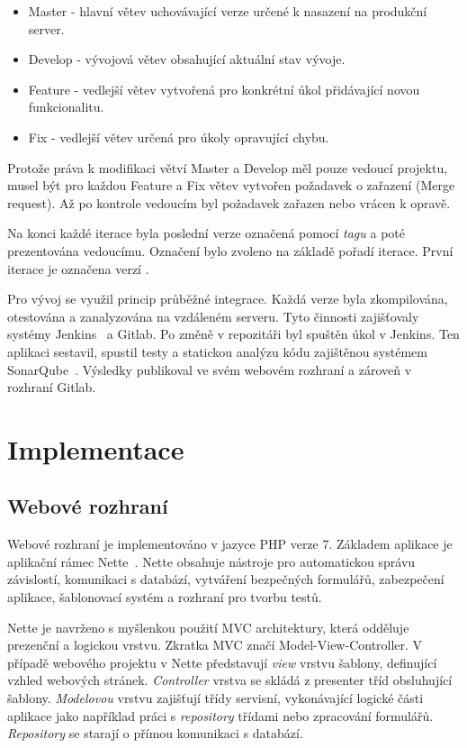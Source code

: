 \documentclass[thesis=B,czech]{FITthesis}[2012/06/26]
\begin{document}
\begin{itemize}
\item Master - hlavní větev uchovávající verze určené k nasazení na produkční server.
\item Develop - vývojová větev obsahující aktuální stav vývoje.
\item Feature - vedlejší větev vytvořená pro konkrétní úkol přidávající novou funkcionalitu.
\item Fix - vedlejší větev určená pro úkoly opravující chybu.
\end{itemize}

Protože práva k modifikaci větví Master a Develop měl pouze vedoucí projektu, musel být pro každou Feature a Fix větev
vytvořen požadavek o zařazení (Merge request). Až po kontrole vedoucím byl požadavek zařazen nebo vrácen k opravě.
\par
Na konci každé iterace byla poslední verze označená pomocí \textit{tagu} a poté prezentována vedoucímu.
Označení bylo zvoleno na základě pořadí iterace. První iterace je označena verzí .
\par
Pro vývoj se využil princip průběžné integrace. Každá verze byla zkompilována, otestována a zanalyzována na vzdáleném serveru.
Tyto činnosti zajišťovaly systémy Jenkins~\cite{jenkins} a Gitlab. Po změně v repozitáři byl spuštěn úkol v Jenkins. Ten aplikaci sestavil, spustil testy a statickou analýzu kódu 
zajištěnou systémem SonarQube~\cite{sonar}. Výsledky publikoval ve svém webovém rozhraní a zároveň v rozhraní Gitlab.  
\section{Implementace}


\subsection{Webové rozhraní}
Webové rozhraní je implementováno v jazyce PHP verze 7. Základem aplikace je aplikační rámec Nette~\cite{nette}. Nette
obsahuje nástroje pro automatickou správu závislostí, komunikaci s databází, vytváření bezpečných formulářů, zabezpečení
aplikace, šablonovací systém a rozhraní pro tvorbu testů. 
\par
Nette je navrženo s myšlenkou použití MVC architektury, která odděluje
prezenční a logickou vrstvu. Zkratka MVC značí Model-View-Controller. V případě webového projektu v Nette představují \textit{view} vrstvu šablony, definující vzhled webových stránek. \textit{Controller} vrstva se skládá z presenter tříd obsluhující šablony. \textit{Modelovou} vrstvu  zajišťují třídy servisní, vykonávající logické části aplikace jako 
například práci s \textit{repository} třídami nebo zpracování formulářů. \textit{Repository} se starají o přímou komunikaci s databází.
\end{document}
